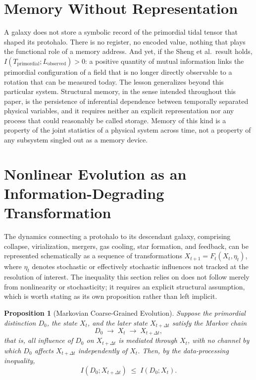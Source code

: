 \documentclass[11pt]{article}
\newtheorem{proposition}{Proposition}
\begin{document}
\section{Memory Without Representation}

A galaxy does not store a symbolic record of the primordial tidal tensor that shaped its protohalo. There is no register, no encoded value, nothing that plays the functional role of a memory address. And yet, if the Sheng et al.\ result holds, $I(T_{\mathrm{primordial}}; L_{\mathrm{observed}}) > 0$: a positive quantity of mutual information links the primordial configuration of a field that is no longer directly observable to a rotation that can be measured today. The lesson generalizes beyond this particular system. Structural memory, in the sense intended throughout this paper, is the persistence of inferential dependence between temporally separated physical variables, and it requires neither an explicit representation nor any process that could reasonably be called storage. Memory of this kind is a property of the joint statistics of a physical system across time, not a property of any subsystem singled out as a memory device.

\section{Nonlinear Evolution as an Information-Degrading Transformation}

The dynamics connecting a protohalo to its descendant galaxy, comprising collapse, virialization, mergers, gas cooling, star formation, and feedback, can be represented schematically as a sequence of transformations $X_{t+1} = F_t(X_t, \eta_t)$, where $\eta_t$ denotes stochastic or effectively stochastic influences not tracked at the resolution of interest. The inequality this section relies on does not follow merely from nonlinearity or stochasticity; it requires an explicit structural assumption, which is worth stating as its own proposition rather than left implicit.

\begin{proposition}[Markovian Coarse-Grained Evolution]
Suppose the primordial distinction $D_0$, the state $X_t$, and the later state $X_{t+\Delta t}$ satisfy the Markov chain
\begin{equation}
D_0 \;\to\; X_t \;\to\; X_{t+\Delta t},
\end{equation}
that is, all influence of $D_0$ on $X_{t+\Delta t}$ is mediated through $X_t$, with no channel by which $D_0$ affects $X_{t+\Delta t}$ independently of $X_t$. Then, by the data-processing inequality,
\begin{equation}
I(D_0; X_{t+\Delta t}) \;\leq\; I(D_0; X_t).
\end{equation}
\end{proposition}
\end{document}
